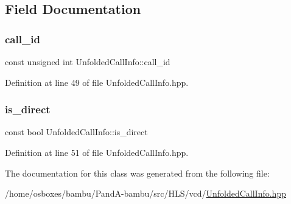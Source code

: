 \subsection{Field Documentation}
\mbox{\label{classUnfoldedCallInfo_ab6f838ffd4b4a87f22714a648c688d70}} 
\subsubsection{\texorpdfstring{call\+\_\+id}{call\_id}}
{\footnotesize\ttfamily const unsigned int Unfolded\+Call\+Info\+::call\+\_\+id}



Definition at line 49 of file Unfolded\+Call\+Info.\+hpp.

\mbox{\label{classUnfoldedCallInfo_a5119fbbd1ede0a9751ccc56f198a59d6}} 
\subsubsection{\texorpdfstring{is\+\_\+direct}{is\_direct}}
{\footnotesize\ttfamily const bool Unfolded\+Call\+Info\+::is\+\_\+direct}



Definition at line 51 of file Unfolded\+Call\+Info.\+hpp.



The documentation for this class was generated from the following file\+:\begin{DoxyCompactItemize}
\item 
/home/osboxes/bambu/\+Pand\+A-\/bambu/src/\+H\+L\+S/vcd/\hyperlink{UnfoldedCallInfo_8hpp}{Unfolded\+Call\+Info.\+hpp}\end{DoxyCompactItemize}
